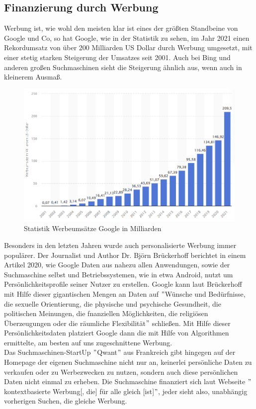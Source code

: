 \subsection{Finanzierung durch Werbung}\label{subsec:finanzierung-durch-werbung}
Werbung ist, wie wohl den meisten klar ist eines der größten Standbeine von Google und Co,
so hat Google, wie in der Statistik zu sehen, im Jahr 2021 einen Rekordumsatz von über 200 Milliarden US Dollar durch Werbung umgesetzt, mit einer stetig starken Steigerung der Umsatzes seit 2001.
Auch bei Bing und anderen großen Suchmaschinen sieht die Steigerung ähnlich aus, wenn auch in kleinerem Ausmaß.
\begin{figure}[h]
    \centering
    \includegraphics[width=120mm]{images/statistic_google_ads}
    \caption{Statistik Werbeumsätze Google in Milliarden}
    \label{fig:statisticAdsGoogle}
\end{figure}
Besonders in den letzten Jahren wurde auch personalisierte Werbung immer populärer.
Der Journalist und Author Dr. Björn Brückerhoff berichtet in einem Artikel 2020, wie Google Daten aus nahezu allen Anwendungen, sowie der Suchmaschine selbst und Betriebssystemen, wie in etwa Android, nutzt um Persönlichkeitsprofile seiner Nutzer zu erstellen.
Google kann laut Brückerhoff mit Hilfe dieser gigantischen Mengen an Daten auf \("\)Wünsche und Bedürfnisse,
die sexuelle Orientierung, die physische und psychische Gesundheit, die politischen Meinungen, die fnanziellen Möglichkeiten, die religiösen Überzeugungen oder die räumliche Flexibilität\("\)\cite{BRK20} schließen.
Mit Hilfe dieser Persönlichkeitsdaten platziert Google dann die mit Hilfe von Algorithmen ermittelte,
am besten auf uns zugeschnittene Werbung.\cite{BRK20}\\

Das Suchmaschinen-StartUp \("\)Qwant\("\) aus Frankreich gibt hingegen auf der Homepage der eigenen Suchmaschine nicht nur an,
keinerlei persönliche Daten zu verkaufen oder zu Werbezwecken zu nutzen, sondern auch diese persönlichen Daten nicht einmal zu erheben.
Die Suchmaschine finanziert sich laut Webseite \("\)kontextbasierte Werbung[, die] für alle gleich [ist]\("\)\cite{QWA22},
jeder sieht also, unabhängig vorherigen Suchen, die gleiche Werbung.

